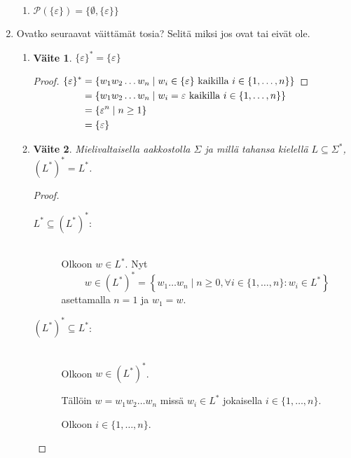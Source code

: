 \documentclass[a4paper,11pt,draft]{article}
\newtheorem*{claim}{Väite}
\newenvironment{lalign}%
{\begin{math}\begin{aligned}[t]}%
{\end{aligned}\end{math}}
\begin{document}
\begin{enumerate}
\begin{enumerate}
  \item
    $\mathcal{P}(\{\varepsilon\}) = \{\emptyset, \{\varepsilon\}\}$
  \end{enumerate}

\newpage
\item Ovatko seuraavat väittämät tosia? Selitä miksi jos ovat tai
  eivät ole.
  \begin{enumerate}
  \item
    \begin{claim}
      $\{\varepsilon\}^{*} = \{\varepsilon\}$
    \end{claim}
    \begin{proof}
      \begin{lalign}
        \{\varepsilon\}^*
        &= \{w_1w_2 \ldots w_n \mid w_i \in \{\varepsilon\}
           \text{ kaikilla } i \in \{1, \ldots, n\}\}\\
        &= \{w_1w_2 \ldots w_n \mid w_i = \varepsilon
           \text{ kaikilla } i \in \{1, \ldots, n\}\}\\
        &= \{\varepsilon^n \mid n \ge 1\}\\
        &= \{\varepsilon\} \qedhere
      \end{lalign}
    \end{proof}

  \item
    \begin{claim}
      Mielivaltaisella aakkostolla $\Sigma$ ja millä tahansa kielellä
      $L \subseteq \Sigma^*$, $(L^*)^* = L^*$.
    \end{claim}
    \begin{proof}
      \hfill
      \begin{description}
      \item[$L^* \subseteq (L^*)^*$:] \hfill \\
        Olkoon $w \in L^*$. Nyt
        \begin{equation*}
        w \in (L^*)^* = \left\{w_1 \ldots w_n \mid n \ge 0,\forall i
        \in \{1, \ldots, n\}: w_i \in L^* \right\}
        \end{equation*}
        asettamalla $n = 1$ ja $w_1 = w$.
      \item[$(L^*)^* \subseteq L^*$:] \hfill \\
        Olkoon $w \in (L^*)^*$.

        Tällöin $w = w_1w_2 \ldots w_n$ missä $w_i \in L^*$ jokaisella
        $i \in \{1, \ldots, n\}$.

        Olkoon $i \in \{1, \ldots, n\}$.


\end{description}
\end{proof}
\end{enumerate}
\end{enumerate}
\end{document}
